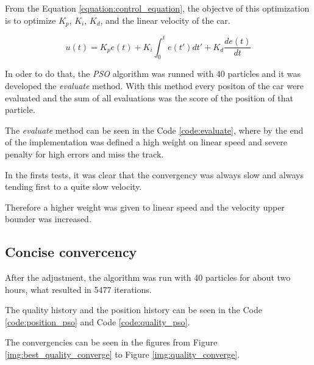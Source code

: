 From the Equation \ref{equation:control_equation}, the objectve of this optimization is to optimize $K_p$, $K_i$, $K_d$, and the linear velocity of the car.

\begin{equation}
    \label{equation:control_equation}
    u(t) =  K_p e(t) + K_i \int_{0}^{t} e(t')dt'+K_d \frac{de(t)}{dt}
\end{equation}

In oder to do that, the \textit{PSO} algorithm was runned with 40 particles and it was developed the \textit{evaluate} method. With this method every positon of the car were evaluated and the sum of all evaluations was the score of the position of that particle.

The \textit{evaluate} method can be seen in the Code \ref{code:evaluate}, where by the end of the implementation was defined a high weight on linear speed and severe penalty for high errors and miss the track.



In the firsts tests, it was clear that the convergency was always slow and always tending first to a quite slow velocity.

Therefore a higher weight was given to linear speed and the velocity upper bounder was increased.

\subsection{Concise convercency}

After the adjustment, the algorithm was run with 40 particles for about two hours, what resulted in 5477 iterations.

The quality history and the position history can be seen in the Code \ref{code:position_pso} and Code \ref{code:quality_pso}.

The convergencies can be seen in the figures from Figure \ref{img:best_quality_converge} to Figure \ref{img:quality_converge}.




